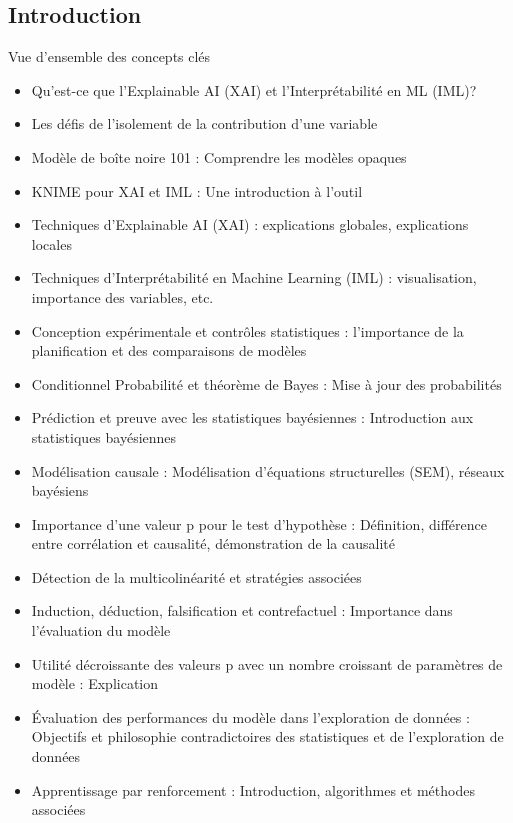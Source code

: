 \documentclass{beamer}
\begin{document}
\subsection{Introduction}	
\begin{frame}{Vue d'ensemble des concepts clés}
	\begin{itemize}
		\item Qu'est-ce que l'Explainable AI (XAI) et l'Interprétabilité en ML (IML)?
		\item Les défis de l'isolement de la contribution d'une variable
		\item Modèle de boîte noire 101 : Comprendre les modèles opaques
		\item KNIME pour XAI et IML : Une introduction à l'outil
		\item Techniques d'Explainable AI (XAI) : explications globales, explications locales
		\item Techniques d'Interprétabilité en Machine Learning (IML) : visualisation, importance des variables, etc.
		\item Conception expérimentale et contrôles statistiques : l'importance de la planification et des comparaisons de modèles
		\item Conditionnel Probabilité et théorème de Bayes : Mise à jour des probabilités
		\item Prédiction et preuve avec les statistiques bayésiennes : Introduction aux statistiques bayésiennes
		\item Modélisation causale : Modélisation d'équations structurelles (SEM), réseaux bayésiens
		\item Importance d'une valeur p pour le test d'hypothèse : Définition, différence entre corrélation et causalité, démonstration de la causalité
		\item Détection de la multicolinéarité et stratégies associées
		\item Induction, déduction, falsification et contrefactuel : Importance dans l'évaluation du modèle
		\item Utilité décroissante des valeurs p avec un nombre croissant de paramètres de modèle : Explication
		\item Évaluation des performances du modèle dans l'exploration de données : Objectifs et philosophie contradictoires des statistiques et de l'exploration de données
		\item Apprentissage par renforcement : Introduction, algorithmes et méthodes associées
	\end{itemize}
\end{frame}
	
\end{document}
